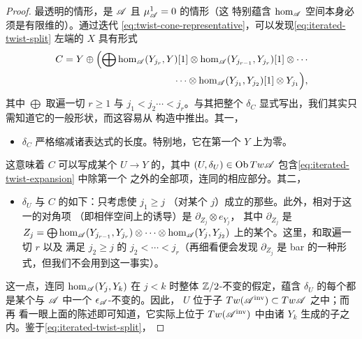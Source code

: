\begin{proof}
最透明的情形，是 $\mathscr{A}$ \trStrictlyUnital{}且 $\mu^1_{\mathscr{A}}=0$ 的情形（这
特别蕴含 $\hom_{\mathscr{A}}$ 空间本身必须是有限维的）。通过迭代
\eqref{eq:twist-cone-representative}，可以发现\eqref{eq:iterated-twist-split}
左端的\trObject{} $X$ 具有形式
\begin{equation}\label{eq:iterated-twist-expansion}
\begin{aligned}
C=Y\oplus\Bigl(\bigoplus \hom_{\mathscr{A}}(Y_{j_r},Y)[1]\otimes
\hom_{\mathscr{A}}(Y_{j_{r-1}},Y_{j_r})[1]\otimes\cdots\\
\cdots\otimes\hom_{\mathscr{A}}(Y_{j_1},Y_{j_2})[1]\otimes Y_{j_1}\Bigr),
\end{aligned}
\end{equation}
其中 $\bigoplus$ 取遍一切 $r\ge 1$ 与 $j_1<j_2\cdots<j_r$。与其把整个%
\trDifferential{} $\delta_C$ 显式写出，我们其实只需知道它的一般形状，而这容易从
构造中推出。其一，
\begin{itemize}
\item $\delta_C$ 严格缩减诸\trTensorProduct{}表达式的长度。特别地，它在第一个%
\trDirectSummand{} $Y$ 上为零。
\end{itemize}
这意味着 $C$ 可以写成某个\trMorphism{} $U\to Y$ 的\trCone，其中
$(U,\delta_U)\in\operatorname{Ob} Tw\mathscr{A}$ 包含\eqref{eq:iterated-twist-expansion} 中除第一个
之外的全部项，连同\trDifferential{}的相应部分。其二，
\begin{itemize}
\item $\delta_U$ 与 $C$ 的如下\trFiltration{}\trCompatible：只考虑使 $j_1\ge j$
（对某个 $j$）成立的那些\trDirectSummand。此外，相对于这一\trFiltration{}的对角项
（即相伴\trGraded{}空间上的诱导\trDifferential）是 $\partial_{Z_j}\otimes e_{Y_j}$，
其中 $\partial_{Z_j}$
是 $Z_j=\bigoplus\hom_{\mathscr{A}}(Y_{j_{r-1}},Y_{j_r})\otimes\cdots\otimes
\hom_{\mathscr{A}}(Y_j,Y_{j_2})$ 上的某个\trDifferential。这里，和取遍一切 $r$ 以及
满足 $j_2\ge j$ 的 $j_2<\cdots<j_r$（再细看便会发现 $\partial_{Z_j}$ 是 bar
\trDifferential{}的一种形式，但我们不会用到这一事实）。
\end{itemize}
这一点，连同 $\hom_{\mathscr{A}}(Y_j,Y_k)$ 在 $j<k$ 时整体 $\mathbb{Z}/2$-不变的假定，蕴含
$\delta_U$ 的每个\trCoefficients{}都是某个\trVectorSpace{}\trHomomorphism{}与
$\mathscr{A}$ 中一个 $\epsilon_{\mathscr{A}}$-不变\trMorphism{}的\trTensorProduct。因此，
$U$ 位于子\trCategory{} $Tw(\mathscr{A}^{\mathrm{inv}})\subset Tw\mathscr{A}$ 之中；而再
看一眼上面的陈述即可知道，它实际上位于 $Tw(\mathscr{A}^{\mathrm{inv}})$ 中由诸 $Y_k$
生成的\trTriangulated{}子\trCategory{}之内。鉴于\eqref{eq:iterated-twist-split}，

\end{proof}
